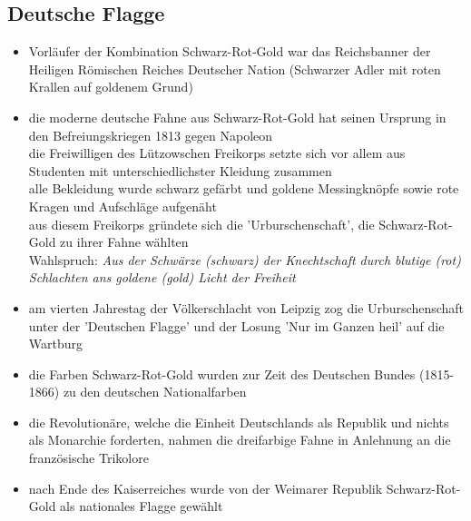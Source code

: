 \documentclass[11pt,a4paper]{article}
\begin{document}
\subsection*{\textsf{Deutsche Flagge}}


\begin{itemize}

\item Vorläufer der Kombination Schwarz-Rot-Gold war das Reichsbanner der Heiligen Römischen Reiches Deutscher Nation (Schwarzer Adler mit roten Krallen auf goldenem Grund)

\item die moderne deutsche Fahne aus Schwarz-Rot-Gold hat seinen Ursprung in den Befreiungskriegen 1813 gegen Napoleon\\
 die Freiwilligen des Lützowschen Freikorps setzte sich vor allem aus Studenten mit unterschiedlichster Kleidung zusammen\\
 alle Bekleidung wurde schwarz gefärbt und goldene Messingknöpfe sowie rote Kragen und Aufschläge aufgenäht\\
 aus diesem Freikorps gründete sich die 'Urburschenschaft', die Schwarz-Rot-Gold zu ihrer Fahne wählten\\
 Wahlspruch: \textsl{Aus der Schwärze (schwarz) der Knechtschaft durch blutige (rot) Schlachten ans goldene (gold) Licht der Freiheit}

\item am vierten Jahrestag der Völkerschlacht von Leipzig zog die Urburschenschaft unter der 'Deutschen Flagge' und der Losung 'Nur im Ganzen heil' auf die Wartburg

\item die Farben Schwarz-Rot-Gold wurden zur Zeit des Deutschen Bundes (1815-1866) zu den deutschen Nationalfarben

\item die Revolutionäre, welche die Einheit Deutschlands als Republik und nichts als Monarchie forderten, nahmen die dreifarbige Fahne in Anlehnung an die französische Trikolore

\item nach Ende des Kaiserreiches wurde von der Weimarer Republik Schwarz-Rot-Gold als nationales Flagge gewählt


\end{itemize}
\end{document}
